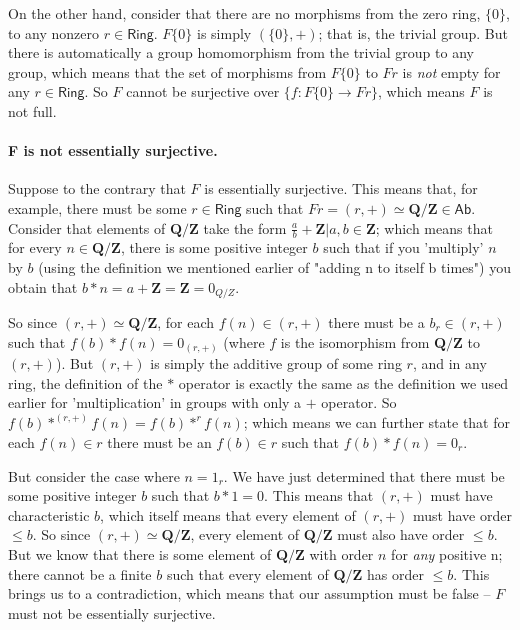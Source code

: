 \documentclass[english]{article}
\begin{document}
	On the other hand, consider that there are no morphisms from the zero ring, \(\{0\}\), to any nonzero \(r \in \textsf{Ring}\). \(F\{0\}\) is simply \((\{0\}, +)\); that is, the trivial group. But there is automatically a group homomorphism from the trivial group to any group, which means that the set of morphisms from \(F\{0\}\) to \(Fr\) is \textit{not} empty for any \(r \in \textsf{Ring}\). So \(F\) cannot be surjective over \(\{f : F\{0\} \to Fr\}\), which means \(F\) is not full.
	
	\paragraph{F is not essentially surjective.}	
	
	Suppose to the contrary that \(F\) is essentially surjective. This means that, for example, there must be some \(r \in \textsf{Ring}\) such that \(Fr = (r, +) \simeq \textbf{Q/Z} \in \textsf{Ab}\). Consider that elements of \(\textbf{Q/Z}\) take the form \(\frac{a}{b} + \textbf{Z} | a, b \in \textbf{Z}\); which means that for every \(n \in \textbf{Q/Z}\), there is some positive integer \(b\) such that if you 'multiply' \(n\) by \(b\) (using the definition we mentioned earlier of "adding n to itself b times") you obtain that \(b*n = a + \textbf{Z} = \textbf{Z} = 0_{Q/Z}\).
	
	So since \((r, +) \simeq \textbf{Q/Z}\), for each \(f(n) \in (r, +)\) there must be a \(b_r \in (r, +)\) such that \(f(b)*f(n) = 0_{(r, +)}\) (where \(f\) is the isomorphism from \(\textbf{Q/Z}\) to \((r,+)\)). But \((r, +)\) is simply the additive group of some ring \(r\), and in any ring, the definition of the \(*\) operator is exactly the same as the definition we used earlier for 'multiplication' in groups with only a \(+\) operator. So \(f(b)*^{(r,+)}f(n) = f(b)*^rf(n)\); which means we can further state that for each \(f(n) \in r\) there must be an \(f(b) \in r\) such that \(f(b)*f(n) = 0_r\).
	
	But consider the case where \(n = 1_r\). We have just determined that there must be some positive integer \(b\) such that \(b*1 = 0\). This means that \((r, +)\) must have characteristic \(b\), which itself means that every element of \((r, +)\) must have order \(\leq b\). So since \((r, +) \simeq \textbf{Q/Z}\), every element of \(\textbf{Q/Z}\) must also have order \(\leq b\). But we know that there is some element of \(\textbf{Q/Z}\) with order \(n\) for \textit{any} positive n; there cannot be a finite \(b\) such that every element of \(\textbf{Q/Z}\) has order \(\leq b\). This brings us to a contradiction, which means that our assumption must be false -- \(F\) must not be essentially surjective.
	
	
	
	
\end{document}
